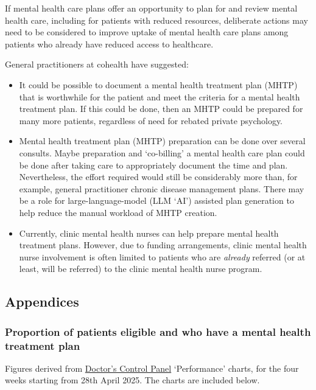 \documentclass[
  letterpaper,
  DIV=11,
  numbers=noendperiod,
  oneside]{scrartcl}
\begin{document}
If mental health care plans offer an opportunity to plan for and review
mental health care, including for patients with reduced resources,
deliberate actions may need to be considered to improve uptake of mental
health care plans among patients who already have reduced access to
healthcare.

General practitioners at cohealth have suggested:

\begin{itemize}
\item
  It could be possible to document a mental health treatment plan (MHTP)
  that is worthwhile for the patient and meet the criteria for a mental
  health treatment plan. If this could be done, then an MHTP could be
  prepared for many more patients, regardless of need for rebated
  private psychology.
\item
  Mental health treatment plan (MHTP) preparation can be done over
  several consults. Maybe preparation and `co-billing' a mental health
  care plan could be done after taking care to appropriately document
  the time and plan. Nevertheless, the effort required would still be
  considerably more than, for example, general practitioner chronic
  disease management plans. There may be a role for large-language-model
  (LLM `AI') assisted plan generation to help reduce the manual workload
  of MHTP creation.
\item
  Currently, clinic mental health nurses can help prepare mental health
  treatment plans. However, due to funding arrangements, clinic mental
  health nurse involvement is often limited to patients who are
  \emph{already} referred (or at least, will be referred) to the clinic
  mental health nurse program.
\end{itemize}

\subsection{Appendices}\label{appendices}

\subsubsection{Proportion of patients eligible and who have a mental
health treatment plan}\label{sec-appendix-mhtpeligible}

Figures derived from
\href{https://www.doctorscontrolpanel.com.au/}{Doctor's Control Panel}
`Performance' charts, for the four weeks starting from 28th April 2025.
The charts are included below.
\end{document}
